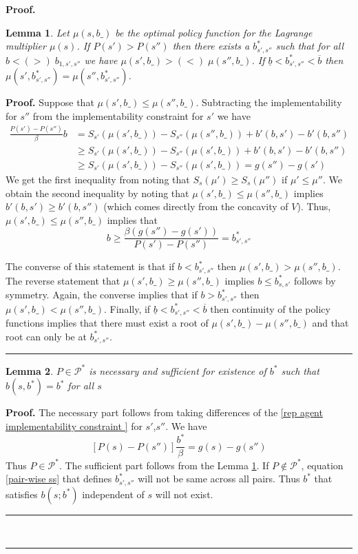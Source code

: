\documentclass[thmsb,11pt]{article}
\newtheorem{lemma}{Lemma}
\newenvironment{proof}[1][Proof]{\noindent \textbf{#1.} }{\  \rule{0.5em}{0.5em}}
\begin{document}
\begin{proof}
\begin{lemma}  Let $\mu(s,b\_)$ be the optimal policy function for the Lagrange multiplier $\mu(s)$.  If $P(s') > P(s'')$ then there exists a $b^*_{s',s''}$ such that for all $b < (>) \; b_{1,s',s''}$ we have $\mu(s',b\_) > (<) \;\mu(s'',b\_)$.  If $\underline b < b^*_{s',s''} < \overline b$ then $\mu(s',b^*_{s',s''}) = \mu(s'',b^*_{s',s''})$.
\label{lem.order}
\end{lemma}
\begin{proof}
Suppose that $\mu(s',b\_)\leq \mu(s'',b\_)$.  Subtracting the implementability for $s''$ from the implementability constraint for $s'$ we have
\begin{align*}
	\frac{P(s')-P(s'')}{\beta}b &= S_{s'}(\mu(s',b\_))-S_{s''}(\mu(s'',b\_)) + b'(b,s')-b'(b,s'')\\
						&\geq S_{s'}(\mu(s',b\_)) -S_{s''}(\mu(s',b\_)) + b'(b,s')-b'(b,s'')\\
						&\geq  S_{s'}(\mu(s',b\_)) -S_{s''}(\mu(s',b\_)) = g(s'')-g(s')
\end{align*}  We get the first inequality from noting that $S_s(\mu')\geq S_s(\mu'')$ if $\mu' \leq \mu''$.  We obtain the second inequality by noting that $\mu(s',b\_)\leq \mu(s'',b\_)$ implies $b'(b,s')\geq b'(b,s'')$ (which comes directly from the concavity of $V$).
Thus, $\mu(s',b\_)\leq \mu(s'',b\_)$ implies that
\begin{equation}
\label{pair-wise ss}
b \geq \frac{\beta(g(s'')-g(s'))}{P(s')-P(s'')} = b^*_{s',s''}
\end{equation}

The converse of this statement is that if $b<b^*_{s',s''}$ then $\mu(s',b\_) > \mu(s'',b\_)$.  The reverse statement that $\mu(s',b\_) \geq \mu(s'',b\_)$ implies $b \leq b^*_{s,s'}$ follows by symmetry.   Again, the converse implies that if $b > b^*_{s',s''}$ then $\mu(s',b\_) < \mu(s'',b\_)$.    Finally, if $\underline b < b^*_{s',s''} <\overline b$ then continuity of the policy functions implies that there must exist a root of $\mu(s',b\_)-\mu(s'',b\_)$ and that root can only be at $b^*_{s',s''}$.
\end{proof}


\begin{lemma}
\label{lem: existence and uniqueness of ss}
$P \in \mathcal{P}^*$ is necessary and sufficient for existence of $b^*$ such that $b(s,b^*)=b^*$ for all $s$
\end{lemma}

\begin{proof}
The necessary part follows from taking differences of the \eqref{rep agent implementability constraint } for $s'$,$s''$. We have
\[[P(s)-P(s'')]\frac{b^*}{\beta}=g(s)-g(s'')\]
Thus $P\in\mathcal{P}^*$. The sufficient part follows from the Lemma \ref{lem.order}. If $P \not \in \mathcal{P}^*$, equation \eqref{pair-wise ss} that defines $b^*_{s',s''}$ will not be same across all pairs. Thus $b^*$ that satisfies $b(s;b^*)$ independent of $s$ will not exist.
\end{proof}



\end{proof}
\end{document}
